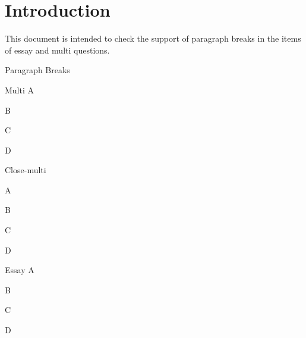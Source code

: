 \documentclass{article}
\begin{document}
\section*{Introduction}

This document is intended to check the support of paragraph breaks in the items 
of essay and multi questions.

\begin{quiz}[points=1]{Paragraph Breaks}
\begin{multi}{Multi}
A
\item* B

C
\item D
\end{multi}

\begin{cloze}{Close-multi}
\begin{multi}[vertical]
A
\item* B

C
\item D
\end{multi}
\end{cloze}

\begin{essay}{Essay}
A
\item B

C
\item D
\end{essay}
\end{quiz}
\end{document}
